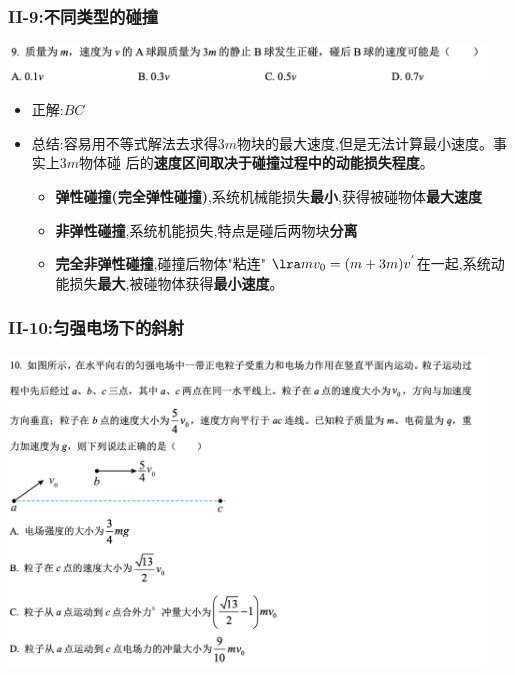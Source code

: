 \documentclass{article}
\begin{document}
\subsubsection{II-9:不同类型的碰撞}
\includegraphics[width=0.95\textwidth,keepaspectratio]{./pictures/1.1-2.png}

\begin{itemize}
    \item 正解:\quad $BC$
    \item 总结:\quad 容易用不等式解法去求得$3m$物块的最大速度,但是无法计算最小速度。事实上$3m$物体碰
          后的\textbf{速度区间取决于碰撞过程中的动能损失程度}。
          \begin{itemize}
              \item \textbf{弹性碰撞(完全弹性碰撞)},系统机械能损失\textbf{最小},获得被碰物体\textbf{最大速度}
              \item \textbf{非弹性碰撞},系统机能损失,特点是碰后两物块\textbf{分离}
              \item \textbf{完全非弹性碰撞},碰撞后物体"粘连"  $ \lra mv_{0} = (m+3m)v^{'} $在一起,系统动能损失\textbf{最大},被碰物体获得\textbf{最小速度}。
          \end{itemize}
\end{itemize}

\vspace{2em}

\subsubsection{II-10:匀强电场下的斜射}
\includegraphics[width=0.95\textwidth,keepaspectratio]{./pictures/1.1-3.png}
\end{document}
